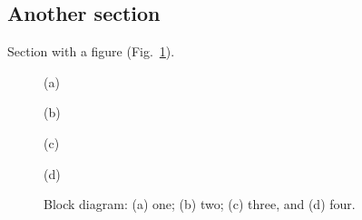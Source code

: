 \documentclass{article}
\begin{document}
\subsection{Another section}  %

Section with a figure (Fig.~\ref{fig:example}).

\begin{figure}[htb]
%
  \begin{minipage}[t]{0.49\linewidth}\centering
    \medskip
    \centerline{(a)}
  \end{minipage}\hfill
%
  \begin{minipage}[t]{0.49\linewidth}\centering
    \medskip
    \centerline{(b)}
  \end{minipage}

  \bigskip

  \begin{minipage}[t]{0.49\linewidth}\centering
    \medskip
    \centerline{(c)}
  \end{minipage}\hfill
%
  \begin{minipage}[t]{0.49\linewidth}\centering
    \medskip
    \centerline{(d)}
  \end{minipage}
%
  \caption{Block diagram: (a) one; (b) two; (c) three, and (d) four.}
  \label{fig:example}
\end{figure}

\parskip=0pt
\parsep=0pt


\end{document}
